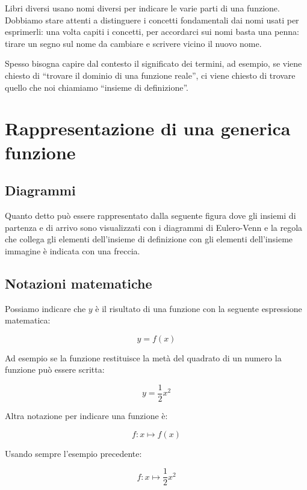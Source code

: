 Libri diversi usano nomi diversi per indicare le varie parti di una 
funzione. 
Dobbiamo stare attenti a distinguere i concetti fondamentali dai nomi 
usati per esprimerli: una volta capiti i concetti, per accordarci sui nomi 
basta una penna: tirare un segno sul nome da cambiare e scrivere vicino il 
nuovo nome.

Spesso bisogna capire dal contesto il significato dei termini, ad esempio, 
se viene chiesto di ``trovare il dominio di una funzione reale'', ci viene 
chiesto di trovare quello che noi chiamiamo ``insieme di definizione''.

\section{Rappresentazione di una generica funzione}
\label{sec:funzioni2_rappresentazione}

\subsection{Diagrammi}

Quanto detto può essere rappresentato dalla seguente figura dove gli 
insiemi di partenza e di arrivo sono visualizzati con i diagrammi di 
Eulero-Venn e la regola che collega gli elementi dell'insieme di definizione 
con gli elementi dell'insieme immagine è indicata con una freccia.

\begin{center}
\end{center}

\subsection{Notazioni matematiche}

Possiamo indicare che $y$ è il risultato di una funzione con la seguente 
espressione matematica:

$$y=f(x)$$

Ad esempio se la funzione restituisce la metà del quadrato di un numero la 
funzione può essere scritta:

$$y=\frac{1}{2}x^2$$

Altra notazione per indicare una funzione è:

$$f: x \mapsto f(x)$$

Usando sempre l'esempio precedente:

$$f: x \mapsto \frac{1}{2}x^2$$


